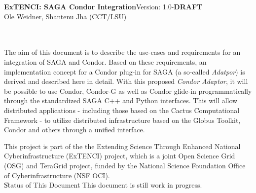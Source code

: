 \newif\ifdraft
\drafttrue                                                                                                   
\ifdraft
\newcommand{\llnote}[1]{ {\textcolor{green} { ***JK: #1 }}}
\newcommand{\alnote}[1]{ {\textcolor{blue} { ***AL: #1 }}}
\newcommand{\jhanote}[1]{ {\textcolor{red} { ***SJ: #1 }}}
\else
\newcommand{\llnote}[1]{}
\newcommand{\alnote}[1]{}
\newcommand{\jhanote}[1]{}
\fi


\newcommand{\sagadocument}{ExTENCI: SAGA Condor Integration}
\newcommand{\sagaversion}{1.0-\textbf{DRAFT}}
\newcommand{\sagabasename}{saga-programming-guide}
\newcommand{\sagaemail}{\{oweidner|sjha\} @ cct.lsu.edu}



\newcommand{\name}{\F{SAGA}\xspace}
\DefineShortVerb{\|}



 \thispagestyle{empty}

  \textbf{\sagadocument}\hfill  Version: \sagaversion\\
  Ole Weidner, Shantenu Jha (CCT/LSU) \hfill {\sagadate} 

  \hrulefill\\[2em]

  \\[4em]

   The aim of this document is to describe the use-cases and
   requirements for an integration of SAGA and Condor. Based on these
   requirements, an implementation concept for a Condor plug-in for SAGA
   (a so-called \textit{Adatpor}) is  derived and described here in
   detail. With this proposed \textit{Condor Adaptor}, it will be
   possible to use Condor, Condor-G as well as Condor glide-in
   programmatically through the standardized SAGA C++ and Python
   interfaces. This will allow distributed applications - including
   those based on the Cactus Computational Framework - to utilize
   distributed infrastructure based on the Globus Toolkit, Condor and
   others through a unified interface.

   This project is part of the the Extending Science Through Enhanced
   National Cyberinfrastructure (ExTENCI) project, which is a joint Open
   Science Grid (OSG) and TeraGrid project, funded by the National
   Science Foundation Office of Cyberinfrastructure (NSF OCI). \\[2em]


   \U{Status of This Document}
   This document is still work in progress.\\
  
